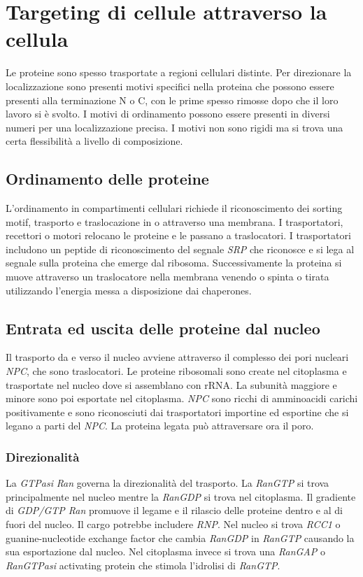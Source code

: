 \section{Targeting di cellule attraverso la cellula}
Le proteine sono spesso trasportate a regioni cellulari distinte. Per direzionare la localizzazione sono presenti motivi specifici nella proteina che possono essere presenti alla terminazione N o C, con le prime spesso rimosse
dopo che il loro lavoro si \`e svolto. I motivi di ordinamento possono essere presenti in diversi numeri per una localizzazione precisa. I motivi non sono rigidi ma si trova una certa flessibilit\`a a livello di composizione. 
\subsection{Ordinamento delle proteine}
L'ordinamento in compartimenti cellulari richiede il riconoscimento dei sorting motif, trasporto e traslocazione in o attraverso una membrana. I trasportatori, recettori o motori relocano le proteine e le passano a traslocatori.
I trasportatori includono un peptide di riconoscimento del segnale \emph{SRP} che riconosce e si lega al segnale sulla proteina che emerge dal ribosoma. Successivamente la proteina si muove attraverso un traslocatore nella
membrana venendo o spinta o tirata utilizzando l'energia messa a disposizione dai chaperones. 
\subsection{Entrata ed uscita delle proteine dal nucleo}
Il trasporto da e verso il nucleo avviene attraverso il complesso dei pori nucleari \emph{NPC}, che sono traslocatori. Le proteine ribosomali sono create nel citoplasma e trasportate nel nucleo dove si assemblano con rRNA. 
La subunit\`a maggiore e minore sono poi esportate nel citoplasma. \emph{NPC} sono ricchi di amminoacidi carichi positivamente e sono riconosciuti dai trasportatori importine ed esportine che si legano a parti del \emph{NPC}. 
La proteina legata pu\`o attraversare ora il poro. 
\subsubsection{Direzionalit\`a}
La \emph{GTPasi} \emph{Ran} governa la direzionalit\`a del trasporto. La \emph{RanGTP} si trova principalmente nel nucleo mentre la \emph{RanGDP} si trova nel citoplasma. Il gradiente di \emph{GDP/GTP Ran} promuove il legame e 
il rilascio delle proteine dentro e al di fuori del nucleo. Il cargo potrebbe includere \emph{RNP}. Nel nucleo si trova \emph{RCC1} o guanine-nucleotide exchange factor che cambia \emph{RanGDP} in \emph{RanGTP} causando la sua 
esportazione dal nucleo. Nel citoplasma invece si trova una \emph{RanGAP} o \emph{RanGTPasi} activating protein che stimola l'idrolisi di \emph{RanGTP}. 
